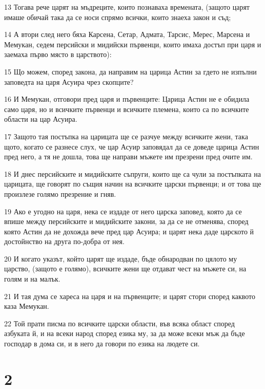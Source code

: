 \par 13 Тогава рече царят на мъдреците, които познаваха времената, (защото царят имаше обичай така да се носи спрямо всички, които знаеха закон и съд;
\par 14 А втори след него бяха Карсена, Сетар, Адмата, Тарсис, Мерес, Марсена и Мемукан, седем персийски и мидийски първенци, които имаха достъп при царя и заемаха първо място в царството):
\par 15 Що можем, според закона, да направим на царица Астин за гдето не изпълни заповедта на царя Асуира чрез скопците?
\par 16 И Мемукан, отговори пред царя и първенците: Царица Астин не е обидила само царя, но и всичките първенци и всичките племена, които са по всичките области на цар Асуира.
\par 17 Защото тая постъпка на царицата ще се разчуе между всичките жени, така щото, когато се разнесе слух, че цар Асуир заповядал да се доведе царица Астин пред него, а тя не дошла, това ще направи мъжете им презрени пред очите им.
\par 18 И днес персийските и мидийските съпруги, които ще са чули за постъпката на царицата, ще говорят по същия начин на всичките царски първенци; и от това ще произлезе голямо презрение и гняв.
\par 19 Ако е угодно на царя, нека се издаде от него царска заповед, която да се впише между персийските и мидийските закони, за да се не отменява, според която Астин да не дохожда вече пред цар Асуира; и царят нека даде царското й достойнство на друга по-добра от нея.
\par 20 И когато указът, който царят ще издаде, бъде обнародван по цялото му царство, (защото е голямо), всичките жени ще отдават чест на мъжете си, на голям и на малък.
\par 21 И тая дума се хареса на царя и на първенците; и царят стори според каквото каза Мемукан.
\par 22 Той прати писма по всичките царски области, във всяка област според азбуката й, и на всеки народ според езика му, за да може всеки мъж да бъде господар в дома си, и в него да говори по езика на людете си.

\chapter{2}

